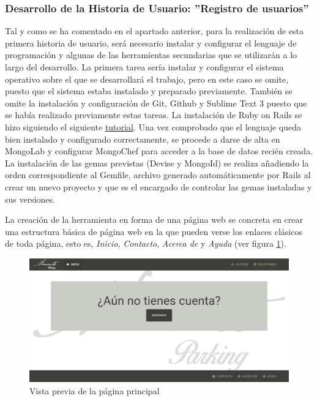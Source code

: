 	\subsubsection{Desarrollo de la Historia de Usuario: ''Registro de usuarios'' }
	Tal y como se ha comentado en el apartado anterior, para la realización de esta primera historia de usuario, será necesario instalar y configurar el lenguaje de programación y algunas de las herramientas secundarias que se utilizarán a lo largo del desarrollo.
	La primera tarea sería instalar y configurar el sistema operativo sobre el que se desarrollará el trabajo, pero en este caso se omite, puesto que el sistema estaba instalado y preparado previamente. También se omite la instalación y configuración de Git, Github y Sublime Text 3 puesto que se había realizado previamente estas tareas.
	La instalación de Ruby on Rails se hizo siguiendo el siguiente \href{http://railsapps.github.io/installrubyonrails-ubuntu.html}{tutorial}.
	Una vez comprobado que el lenguaje queda bien instalado y configurado correctamente, se procede a darse de alta en MongoLab y configurar MongoChef para acceder a la base de datos recién creada.
	La instalación de las gemas previstas (Devise y MongoId) se realiza añadiendo la orden correspondiente al Gemfile, archivo generado automáticamente por Rails al crear un nuevo proyecto y que es el encargado de controlar las gemas instaladas y sus versiones.
	
	La creación de la herramienta en forma de una página web se concreta en crear una estructura básica de página web en la que pueden verse los enlaces clásicos de toda página, esto es, \textit{Inicio}, \textit{Contacto}, \textit{Acerca de} y \textit{Ayuda} (ver figura \ref{fig:acceso_usuarios_01}).\\
	
	\begin{figure}[H]
		\centering
		\includegraphics[width=15cm, fbox={\fboxrule} 4mm]{images/05-resultados/04-acceso_usuarios_1.png}
		\caption{Vista previa de la página principal}
		\label{fig:acceso_usuarios_01}
	\end{figure}

